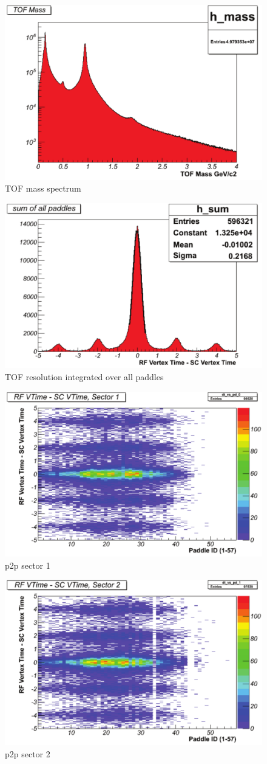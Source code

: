 \begin{figure}\begin{center}
    \includegraphics[width=.40\linewidth]{figures/calib/tof/Tof_56855_final_mass.pdf}
    \caption{TOF mass spectrum}
    \label{plt:tofmass}
\end{center}\end{figure}

\begin{figure}\begin{center}
    \includegraphics[width=.40\linewidth]{figures/calib/tof/Tof_56855_final_resolution.pdf}
    \caption{TOF resolution integrated over all paddles}
    \label{plt:tofres}
\end{center}\end{figure}

\begin{figure}\begin{center}
    \includegraphics[width=.40\linewidth]{figures/calib/tof/Tof_56855_final_s1p2p.pdf}
    \caption{p2p sector 1}
    \label{plt:tofsec1}
\end{center}\end{figure}

\begin{figure}\begin{center}
    \includegraphics[width=.40\linewidth]{figures/calib/tof/Tof_56855_final_s2p2p.pdf}
    \caption{p2p sector 2}
    \label{plt:tofsec2}
\end{center}\end{figure}

